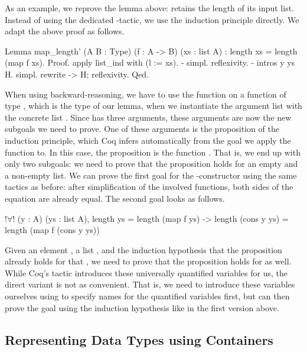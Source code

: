 As an example, we reprove the lemma above:  retains the length of its input list.
Instead of using the dedicated \--tactic, we use the induction principle directly.
We adapt the above proof as follows.

\begin{coqcode}
Lemma map_length' (A B : Type) (f : A -> B) (xs : list A)
  : length xs = length (map f xs).
Proof.
  apply list_ind with (l := xs).
  - simpl. reflexivity.
  - intros y ys H. simpl. rewrite -> H; reflexivity.
Qed.
\end{coqcode}

When using backward\--reasoning, we have to use the function  on a function of type , which is the type of our lemma, when we instantiate the argument list  with the concrete list .
Since  has three arguments, these arguments are now the new subgoals we need to prove.
One of these arguments is the proposition  of the induction principle, which Coq infers automatically from the goal we apply the function to.
In this case, the proposition is the function .
That is, we end up with only two subgoals: we need to prove that the proposition holds for an empty and a non\--empty list.
We can prove the first goal for the \--constructor using the same tactics as before: after simplification of the involved functions, both sides of the equation are already equal.
The second goal looks as follows.

\begin{coqcode}
  !$\forall$! (y : A) (ys : list A),
    length ys = length (map f ys) ->
    length (cons y ys) = length (map f (cons y ys))
\end{coqcode}

Given an element ,  a list , and the induction hypothesis that the proposition already holds for that , we need to prove that the proposition holds for  as well.
While Coq's  tactic introduces these universally quantified variables for us, the direct variant is not as convenient.
That is, we need to introduce these variables ourselves using  to specify names for the quantified variables first, but can then prove the goal using the induction hypothesis like in the first version above.

\subsection{Representing Data Types using Containers}
\label{sub:container}

